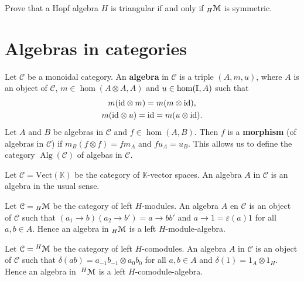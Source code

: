 \begin{exercise}\label{exercise:triangular}
Prove that a Hopf algebra $H$ is triangular if and only if ${}_{H}\mathcal{M}$ is
symmetric. 
\end{exercise}

\section{Algebras in categories}

\begin{definition}
Let $\mathcal{C}$ be a monoidal category. An \textbf{algebra} in
$\mathcal{C}$ is a triple $(A,m,u)$, where $A$ is an object of
$\mathcal{C}$, $m\in\hom(A\otimes A,A)$ and $u\in\hom(\mathbb{I},A)$ such that 
\begin{gather*}
m(\mathrm{id}\otimes m)=m(m\otimes\mathrm{id}),\\
m(\mathrm{id}\otimes u)=\mathrm{id}=m(u\otimes\mathrm{id}).
\end{gather*}
Let $A$ and $B$ be algebras in $\mathcal{C}$ and $f\in\hom(A,B)$.
Then $f$ is a \textbf{morphism} (of algebras in $\mathcal{C}$)
if $m_{B}(f\otimes f)=fm_{A}$ and $fu_{A}=u_{B}$. This allows
us to define the category $\operatorname{Alg}(\mathcal{C})$
of algebas in $\mathcal{C}$. 
\end{definition}

\begin{example}
Let $\mathcal{C}=\mathrm{Vect}(\mathbb{K})$ be the category of
$\mathbb{K}$-vector spaces. An algebra $A$ in $\mathcal{C}$ is an algebra in
the usual sense.
\end{example}

\begin{example}
Let $\mathcal{C}={}_{H}\mathcal{M}$ be the category of left $H$-modules.  An algebra $A$
en $\mathcal{C}$ is an object of $\mathcal{C}$ such that $(a_{1}\to b)(a_{2}\to
b')=a\to bb'$ and $a\to1=\varepsilon(a)1$ for all $a,b\in A$. Hence an algebra
in ${}_{H}\mathcal{M}$ is a left $H$-module-algebra.
\end{example}

\begin{example}
Let $\mathcal{C=}\;^{H}\mathcal{M}$ be the category of left $H$-comodules.  An algebra
$A$ in $\mathcal{C}$ is an object of $\mathcal{C}$ such that
$\delta(ab)=a_{-1}b{}_{-1}\otimes a_{0}b{}_{0}$ for all $a,b\in A$ and
$\delta(1)=1_{A}\otimes1_{H}$.  Hence an algebra in $\;^{H}\mathcal{M}$ is a left
$H$-comodule-algebra.
\end{example}

